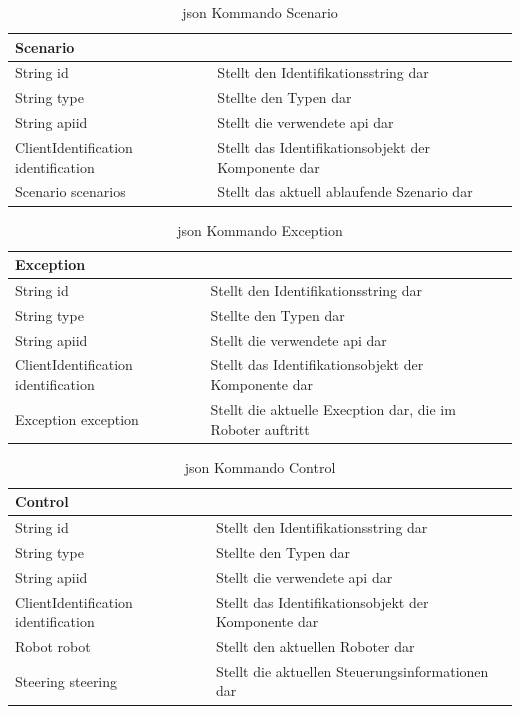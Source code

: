 \begin{table}[h]
	\centering
	\begin{tabular}{|p{4cm}|p{10cm}|}
		\hline
		\textbf{Scenario} & \\
		\hline
		String id & Stellt den Identifikationsstring dar \\
		String type & Stellte den Typen dar \\
		String apiid & Stellt die verwendete \gls{api} dar \\
		ClientIdentification identification & Stellt das Identifikationsobjekt der Komponente dar \\
		Scenario scenarios & Stellt das aktuell ablaufende Szenario dar \\
		\hline
	\end{tabular}
	\caption[\gls{json} Kommando Scenario]{\gls{json} Kommando Scenario}
	\label{tab:Szenario}
\end{table}

\begin{table}[h]
	\centering
	\begin{tabular}{|p{4cm}|p{10cm}|}
		\hline
		\textbf{Exception} & \\
		\hline
		String id & Stellt den Identifikationsstring dar \\
		String type & Stellte den Typen dar \\
		String apiid & Stellt die verwendete \gls{api} dar \\
		ClientIdentification identification & Stellt das Identifikationsobjekt der Komponente dar \\
		Exception exception & Stellt die aktuelle Execption dar, die im Roboter auftritt \\
		\hline
	\end{tabular}
	\caption[\gls{json} Kommando Exception]{\gls{json} Kommando Exception}
	\label{tab:Exception}
\end{table}

\begin{table}[h]
	\centering
	\begin{tabular}{|p{4cm}|p{10cm}|}
		\hline
		\textbf{Control} & \\
		\hline
		String id & Stellt den Identifikationsstring dar \\
		String type & Stellte den Typen dar \\
		String apiid & Stellt die verwendete \gls{api} dar \\
		ClientIdentification identification & Stellt das Identifikationsobjekt der Komponente dar \\
		Robot robot & Stellt den aktuellen Roboter dar\\
		Steering steering & Stellt die aktuellen Steuerungsinformationen dar \\
		\hline
	\end{tabular}
	\caption[\gls{json} Kommando Control]{\gls{json} Kommando Control}
	\label{tab:Control}
\end{table}

